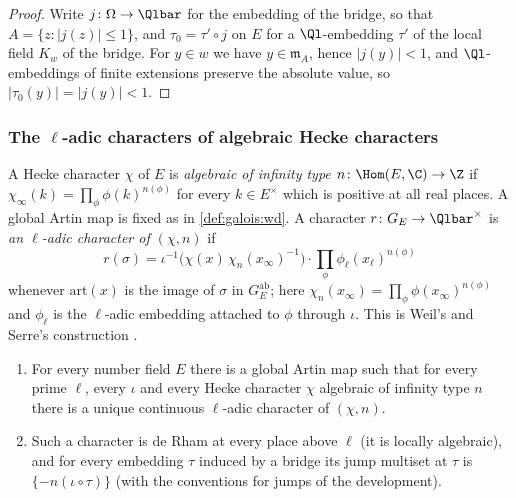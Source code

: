 \begin{proof}
Write $j\colon\Omega\to\Qlbar$ for the embedding of the bridge, so that $A=\{z:|j(z)|\le1\}$, and
$\tau_0=\tau'\circ j$ on $E$ for a $\Ql$-embedding $\tau'$ of the local field $K_w$ of the bridge. For $y\in w$
we have $y\in\mathfrak m_A$, hence $|j(y)|<1$, and $\Ql$-embeddings of finite extensions preserve the
absolute value, so $|\tau_0(y)|=|j(y)|<1$.
\end{proof}

\subsubsection{The $\ell$-adic characters of algebraic Hecke characters}

A Hecke character $\chi$ of $E$ is \emph{algebraic of infinity type $n\colon\Hom(E,\C)\to\Z$} if
$\chi_\infty(k)=\prod_\phi\phi(k)^{n(\phi)}$ for every $k\in E^\times$ which is positive at all real places. A global
Artin map is fixed as in \cref{def:galois:wd}. A character $r\colon G_E\to\Qlbar^\times$ is \emph{an $\ell$-adic
character of $(\chi,n)$} if
\begin{equation}\label{eq:pf:geo:ladic}
  r(\sigma)=\iota^{-1}\bigl(\chi(x)\,\chi_n(x_\infty)^{-1}\bigr)\cdot\prod_{\phi}\phi_\ell(x_\ell)^{n(\phi)}
\end{equation}
whenever $\mathrm{art}(x)$ is the image of $\sigma$ in $G_E^{\mathrm{ab}}$; here
$\chi_n(x_\infty)=\prod_\phi\phi(x_\infty)^{n(\phi)}$ and $\phi_\ell$ is the $\ell$-adic embedding attached to $\phi$
through $\iota$. This is Weil's and Serre's construction \cite{Weil1956,Serre1968}.

\begin{littheorem}\label{pf:geo:lit:ladic}
\begin{enumerate}[label=(\alph*),nosep]
\item For every number field $E$ there is a global Artin map such that for every prime $\ell$, every
  $\iota$ and every Hecke character $\chi$ algebraic of infinity type $n$ there is a unique continuous
  $\ell$-adic character of $(\chi,n)$.
\item Such a character is de Rham at every place above $\ell$ (it is locally algebraic), and for every
  embedding $\tau$ induced by a bridge its jump multiset at $\tau$ is $\{-n(\iota\circ\tau)\}$ (with the conventions
  for jumps of the development).
\end{enumerate}
\end{littheorem}

